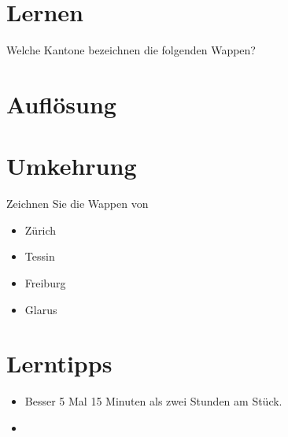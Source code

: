   





\usepackage{cancel}

\thispagestyle{fancy}
\section*{Lernen}

Welche Kantone bezeichnen die folgenden Wappen?
\newpage

\section*{Auf\/lösung}
\newpage
\section*{Umkehrung}
Zeichnen Sie die Wappen von
\begin{itemize}
\item Zürich
\item Tessin
\item Freiburg
\item Glarus
\end{itemize}
\newpage

\section*{Lerntipps}
\begin{itemize}
\item Besser 5 Mal 15 Minuten als zwei Stunden am Stück.
\item
\end{itemize}


